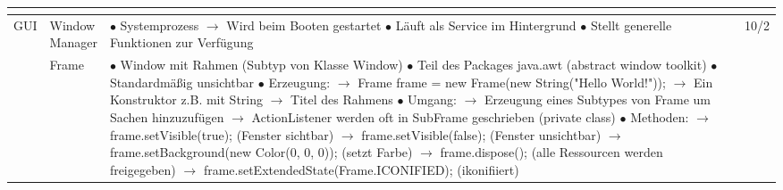 \documentclass[11pt,a4paper]{article}
\begin{document}
\begin{center}
\begin{longtable}[h]{ | p{2.3cm} | p{2.3cm} | p{12.6cm} | p{1.2cm} | }
	
			
	\multicolumn{3}{c}{} \\ 
	\hline 
	
	
	
	{\large GUI} & \makecell[l]{Window \\Manager} & \makecell[l]{$\bullet$ Systemprozess $\rightarrow$ Wird beim Booten gestartet \\
	$\bullet$ Läuft als Service im Hintergrund \\
	$\bullet$ Stellt generelle Funktionen zur Verfügung } & 10/2 \\ \cline{2-4}
	
	& Frame & \makecell[l]{$\bullet$ Window mit Rahmen (Subtyp von Klasse Window) \\
	$\bullet$ Teil des Packages java.awt (abstract window toolkit) \\
	$\bullet$ Standardmäßig unsichtbar \\
	$\bullet$ Erzeugung: \\
	\hspace{0.4cm} $\rightarrow$ Frame frame = new Frame(new String("Hello World!")); \\
	\hspace{0.4cm} $\rightarrow$ Ein Konstruktor z.B. mit String $\rightarrow$ Titel des Rahmens \\
	$\bullet$ Umgang: \\
	\hspace{0.4cm} $\rightarrow$ Erzeugung eines Subtypes von Frame um Sachen hinzuzufügen\\
	\hspace{0.4cm} $\rightarrow$ ActionListener werden oft in SubFrame geschrieben (private class) \\
	$\bullet$ Methoden: \\
	\hspace{0.4cm} $\rightarrow$ frame.setVisible(true); (Fenster sichtbar) \\
	\hspace{0.4cm} $\rightarrow$ frame.setVisible(false); (Fenster unsichtbar) \\
	\hspace{0.4cm} $\rightarrow$ frame.setBackground(new Color(0, 0, 0)); (setzt Farbe) \\
	\hspace{0.4cm} $\rightarrow$ frame.dispose(); (alle Ressourcen werden freigegeben) \\
	\hspace{0.4cm} $\rightarrow$ frame.setExtendedState(Frame.ICONIFIED); (ikonifiiert) \\
}
\end{longtable}
\end{center}
\end{document}
